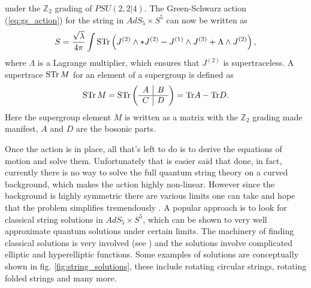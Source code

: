 under the $\mathbb{Z}_2$ grading of $PSU(2,2|4)$. The Green-Schwarz action (\ref{eq:gs_action}) for the string in $AdS_5 \times S^5$ can now be written as \cite{current_action}
\begin{equation}
	S = \frac{\sqrt{\lambda}}{4 \pi} \int \operatorname{STr} \left( J^{(2)} \wedge * J^{(2)} - J^{(1)} \wedge J^{(3)} + \Lambda \wedge J^{(2)} \right),
\end{equation}
where $\Lambda$ is a Lagrange multiplier, which ensures that $J^{(2)}$ is supertraceless. A supertrace $\operatorname{STr} M$ for an element of a supergroup is defined as
\begin{equation}
\operatorname{STr} M = \operatorname{STr}
\left( {\begin{array}{c|c}
 A & B  \\
 \hline
 C & D  \\
 \end{array} } \right) = \mathrm{Tr} A - \mathrm{Tr} D.
\end{equation}
Here the supergroup element $M$ is written as a matrix with the $\mathbb{Z}_2$ grading made manifest, $A$ and $D$ are the bosonic parts.

Once the action is in place, all that's left to do is to derive the equations of motion and solve them. Unfortunately that is easier said that done, in fact, currently there is no way to solve the full quantum string theory on a curved background, which makes the action highly non-linear. However since the background is highly symmetric there are various limits one can take and hope that the problem simplifies tremendously \cite{algebraic_curve}. A popular approach is to look for classical string solutions in $AdS_5 \times S^5$, which can be shown to very well approximate quantum solutions under certain limits. The machinery of finding classical solutions is very involved (see \cite{tseytlin_classical}) and the solutions involve complicated elliptic and hyperelliptic functions. Some examples of solutions are conceptually shown in fig. \ref{fig:string_solutions}, these include rotating circular strings, rotating folded strings and many more. 

